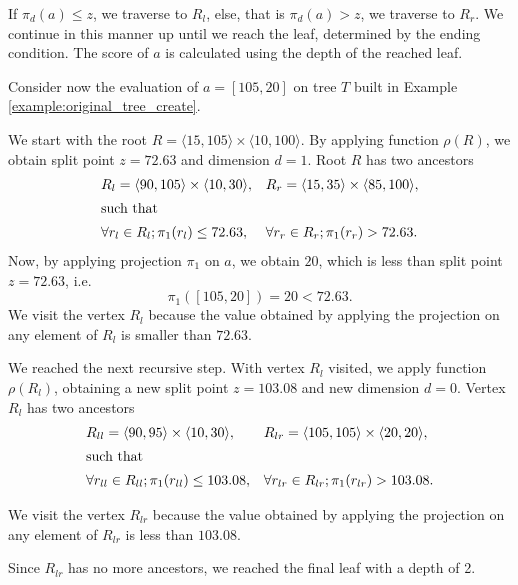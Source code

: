 If $\pi_d(a)\le z$, we traverse to $R_l$, else, that is $\pi_d(a) > z$, we traverse to $R_r$.
We continue in this manner up until we reach the leaf, determined by the ending condition. The score of $a$ is calculated using the depth of the reached leaf.

\begin{example}
\label{ex:regular_point_evaluation_original}
    Consider now the evaluation of $a = [105,20]$ on tree $T$ built in Example \ref{example:original_tree_create}.

    We start with the root $R = \langle 15,105\rangle \times \langle 10, 100 \rangle$.
    By applying function $\rho(R)$, we obtain split point $z = 72.63$ and dimension $d = 1$.
    Root $R$ has two ancestors 
\begin{align*}
    &R_l = \langle 90,105\rangle \times \langle 10, 30 \rangle,&
    &R_r = \langle 15,35\rangle \times \langle 85, 100 \rangle,\\
    \intertext{such that}
    &\forall r_l\in R_l; \pi_1(r_l) \le 72.63,&
    &\forall r_r\in R_r; \pi_1(r_r) > 72.63.
\end{align*}
Now, by applying projection $\pi_1$ on $a$, we obtain $20$, which is less than split point $z = 72.63$, i.e.
$$\pi_1([105,20]) = 20 < 72.63.$$
We visit the vertex $R_l$ because the value obtained by applying the projection on any element of $R_l$ is smaller than $72.63$.

We reached the next recursive step. With vertex $R_l$ visited, we apply function $\rho(R_l)$, obtaining a new split point $z = 103.08$ and new dimension $d = 0$.
Vertex $R_l$ has two ancestors 
\begin{align*}
    &R_{ll} = \langle 90,95\rangle \times \langle 10, 30 \rangle,&
    &R_{lr} = \langle 105,105\rangle \times \langle 20,20 \rangle,\\
    \intertext{such that}
    &\forall r_{ll}\in R_{ll}; \pi_1(r_{ll}) \le 103.08,&
    &\forall r_{lr}\in R_{lr}; \pi_1(r_{lr}) > 103.08.
\end{align*}

We visit the vertex $R_{lr}$ because the value obtained by applying the projection on any element of $R_{lr}$ is less than $103.08$.

Since $R_{lr}$ has no more ancestors, we reached the final leaf with a depth of 2.
\end{example}


